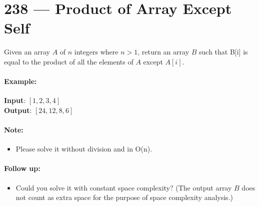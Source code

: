 \section{238 --- Product of Array Except Self}
Given an array $A$ of $n$ integers where $n > 1$,  return an array $B$ such that B[i] is equal to the product of all the elements of $A$ except $A[i]$.

\paragraph{Example:}
\begin{flushleft}
\textbf{Input}:  $[1,2,3,4]$
\\
\textbf{Output}: $[24,12,8,6]$
\end{flushleft}

\paragraph{Note:}
\begin{itemize}
\item Please solve it without division and in O(n).
\end{itemize}

\paragraph{Follow up:}
\begin{itemize}
\item Could you solve it with constant space complexity? (The output array $B$ does not count as extra space for the purpose of space complexity analysis.)
\end{itemize}

